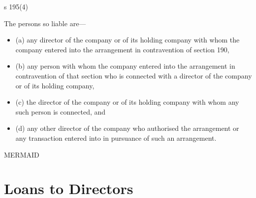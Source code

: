 \documentclass[
]{article}
\providecommand{\tightlist}{%
  \setlength{\itemsep}{0pt}\setlength{\parskip}{0pt}}
\newenvironment{env-136e818f-6bd8-45c9-b7d8-e6b8925f9e62}
{
    \savenotes\tcolorbox[blanker,breakable,left=5pt,borderline west={2pt}{-4pt}{green}]
}
{
    \endtcolorbox\spewnotes
}
\begin{document}
\begin{env-136e818f-6bd8-45c9-b7d8-e6b8925f9e62}

s 195(4)

The persons so liable are---

\begin{itemize}
\tightlist
\item
  (a) any director of the company or of its holding company with whom
  the company entered into the arrangement in contravention of section
  190,
\item
  (b) any person with whom the company entered into the arrangement in
  contravention of that section who is connected with a director of the
  company or of its holding company,
\item
  (c) the director of the company or of its holding company with whom
  any such person is connected, and
\item
  (d) any other director of the company who authorised the arrangement
  or any transaction entered into in pursuance of such an arrangement.
\end{itemize}

\end{env-136e818f-6bd8-45c9-b7d8-e6b8925f9e62}

MERMAID

\hypertarget{loans-to-directors}{%
\section{Loans to Directors}\label{loans-to-directors}}
\end{document}
